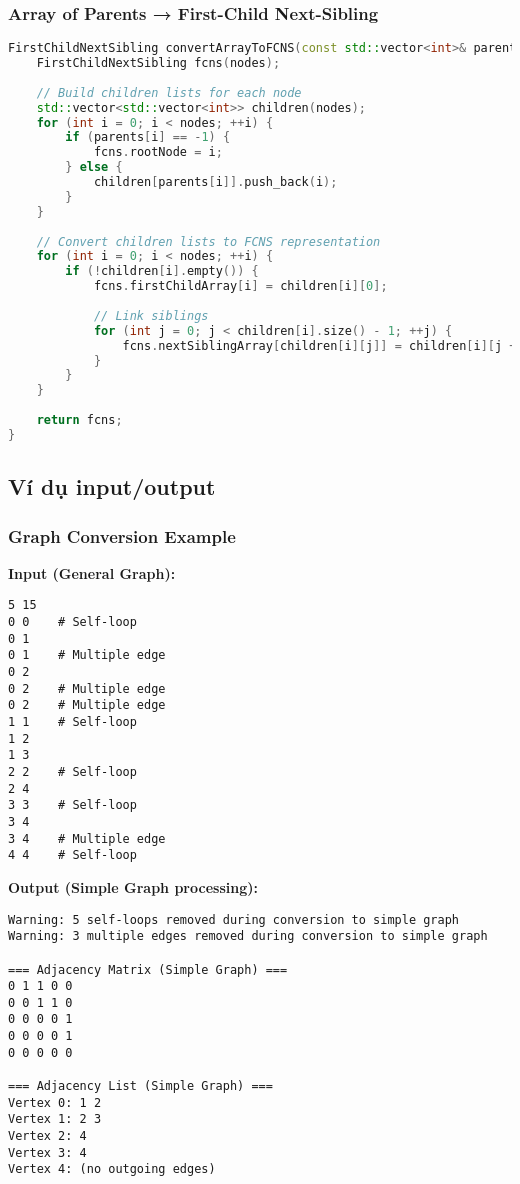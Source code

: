 \documentclass[12pt]{article}
\begin{document}
\subsubsection*{Array of Parents → First-Child Next-Sibling}
\begin{lstlisting}[language=C++, basicstyle=\ttfamily\footnotesize, frame=single]
FirstChildNextSibling convertArrayToFCNS(const std::vector<int>& parents, int nodes) {
    FirstChildNextSibling fcns(nodes);
    
    // Build children lists for each node
    std::vector<std::vector<int>> children(nodes);
    for (int i = 0; i < nodes; ++i) {
        if (parents[i] == -1) {
            fcns.rootNode = i;
        } else {
            children[parents[i]].push_back(i);
        }
    }
    
    // Convert children lists to FCNS representation
    for (int i = 0; i < nodes; ++i) {
        if (!children[i].empty()) {
            fcns.firstChildArray[i] = children[i][0];
            
            // Link siblings
            for (int j = 0; j < children[i].size() - 1; ++j) {
                fcns.nextSiblingArray[children[i][j]] = children[i][j + 1];
            }
        }
    }
    
    return fcns;
}
\end{lstlisting}

\subsection*{Ví dụ input/output}

\subsubsection*{Graph Conversion Example}
\textbf{Input (General Graph):}
\begin{verbatim}
5 15
0 0    # Self-loop
0 1
0 1    # Multiple edge
0 2
0 2    # Multiple edge
0 2    # Multiple edge
1 1    # Self-loop
1 2
1 3
2 2    # Self-loop
2 4
3 3    # Self-loop
3 4
3 4    # Multiple edge
4 4    # Self-loop
\end{verbatim}

\textbf{Output (Simple Graph processing):}
\begin{verbatim}
Warning: 5 self-loops removed during conversion to simple graph
Warning: 3 multiple edges removed during conversion to simple graph

=== Adjacency Matrix (Simple Graph) ===
0 1 1 0 0
0 0 1 1 0
0 0 0 0 1
0 0 0 0 1
0 0 0 0 0

=== Adjacency List (Simple Graph) ===
Vertex 0: 1 2
Vertex 1: 2 3
Vertex 2: 4
Vertex 3: 4
Vertex 4: (no outgoing edges)
\end{verbatim}
\end{document}
